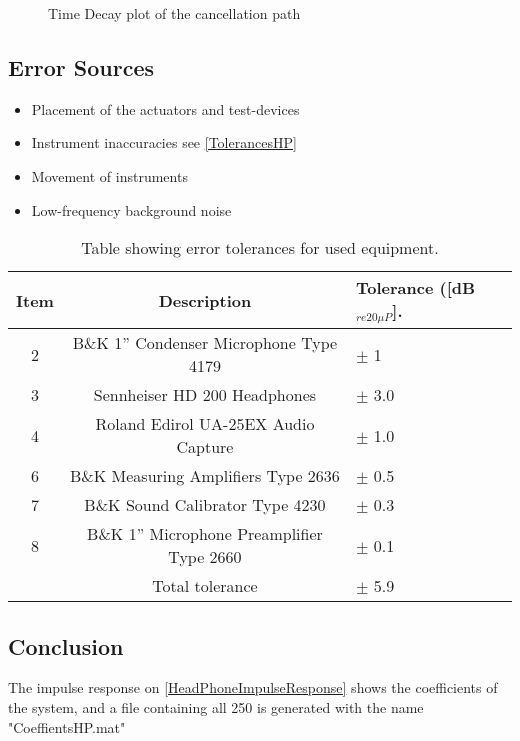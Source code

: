 \begin{figure}[H]
	\centering
	
	\caption{Time Decay plot of the cancellation path}
	\label{TimeDecayPlotHeadphone}
\end{figure}




\subsection{Error Sources}
\begin{itemize}
	\item Placement of the actuators and test-devices
	\item Instrument inaccuracies see \autoref{TolerancesHP}
	\item Movement of instruments
	\item Low-frequency background noise
\end{itemize}

\begin{table}[H]
	\centering
	\begin{tabular}{ c c l } \toprule
	{Item}	& 		{Description} 							& {Tolerance ([dB$_{re20\mu P}$]}.\\ \bottomrule 
		2	&	B\&K 1'' Condenser Microphone Type 4179 	& $\pm$ 1		\\
		3	&	Sennheiser HD 200 Headphones				& $\pm$ 3.0		\\
		4	&	Roland Edirol UA-25EX Audio Capture			& $\pm$ 1.0		\\
		6	&	B\&K Measuring Amplifiers Type 2636			& $\pm$ 0.5		\\
		7	&	B\&K Sound Calibrator Type 4230				& $\pm$ 0.3		\\ 
		8	&	B\&K 1'' Microphone Preamplifier Type 2660	& $\pm$ 0.1		\\ \bottomrule
			&	Total tolerance								& $\pm$ 5.9		\\ \bottomrule	
	\end{tabular}
	\caption{Table showing error tolerances for used equipment.}
	\label{TolerancesHP}
\end{table}

\subsection{Conclusion}
The impulse response on \autoref{HeadPhoneImpulseResponse} shows the coefficients of the system, and a file containing all 250 is generated with the name "CoeffientsHP.mat"